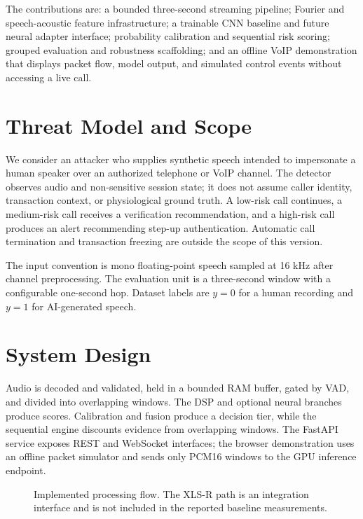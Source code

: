 \documentclass[journal]{IEEEtran}
\begin{document}
The contributions are: a bounded three-second streaming pipeline; Fourier and speech-acoustic feature infrastructure; a trainable CNN baseline and future neural adapter interface; probability calibration and sequential risk scoring; grouped evaluation and robustness scaffolding; and an offline VoIP demonstration that displays packet flow, model output, and simulated control events without accessing a live call.

\section{Threat Model and Scope}
We consider an attacker who supplies synthetic speech intended to impersonate a human speaker over an authorized telephone or VoIP channel. The detector observes audio and non-sensitive session state; it does not assume caller identity, transaction context, or physiological ground truth. A low-risk call continues, a medium-risk call receives a verification recommendation, and a high-risk call produces an alert recommending step-up authentication. Automatic call termination and transaction freezing are outside the scope of this version.

The input convention is mono floating-point speech sampled at 16 kHz after channel preprocessing. The evaluation unit is a three-second window with a configurable one-second hop. Dataset labels are $y=0$ for a human recording and $y=1$ for AI-generated speech.

\section{System Design}
Audio is decoded and validated, held in a bounded RAM buffer, gated by VAD, and divided into overlapping windows. The DSP and optional neural branches produce scores. Calibration and fusion produce a decision tier, while the sequential engine discounts evidence from overlapping windows. The FastAPI service exposes REST and WebSocket interfaces; the browser demonstration uses an offline packet simulator and sends only PCM16 windows to the GPU inference endpoint.

\begin{figure}[t]
\centering
{}
\caption{Implemented processing flow. The XLS-R path is an integration interface and is not included in the reported baseline measurements.}
\label{fig:architecture}
\end{figure}
\end{document}
